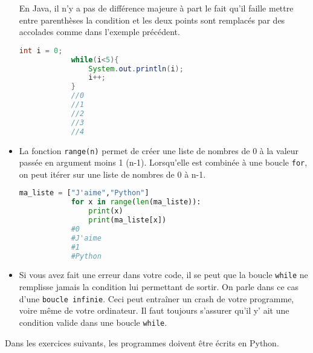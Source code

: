 \begin{itemize}
     	En Java, il n'y a pas de différence majeure à part le fait qu'il faille mettre entre parenthèses la condition et les deux points sont remplacés par des accolades comme dans l'exemple précédent. \\
     	
     	\begin{lstlisting}[language=Java]
            int i = 0;
            while(i<5){
            	System.out.println(i);
            	i++;
            }
            //0
            //1
            //2
            //3
            //4
     	\end{lstlisting}
     	
     	
     	\item La fonction \lstinline{range(n)} permet de créer une liste de nombres de 0 à la valeur passée en argument moins 1 (n-1). Lorsqu’elle est combinée à une boucle \lstinline{for}, on peut itérer sur une liste de nombres de 0 à n-1. \\
     	
     	\begin{lstlisting}[language=Python]
         	ma_liste = ["J'aime","Python"]
      		for x in range(len(ma_liste)):
      			print(x)
           		print(ma_liste[x])
           	#0
           	#J'aime
           	#1
           	#Python
     	\end{lstlisting}
     	
     	\item Si vous avez fait une erreur dans votre code, il se peut que la boucle \lstinline{while} ne remplisse jamais la condition lui permettant de sortir. On parle dans ce cas d'une \lstinline{boucle infinie}. Ceci peut entraîner un crash de votre programme, voire même de votre ordinateur. Il faut toujours s'assurer qu'il y' ait une condition valide dans une boucle \lstinline{while}. \\
     	
     	\end{itemize}
     	
     	Dans les exercices suivants, les programmes doivent être écrits en Python.\\
     	
